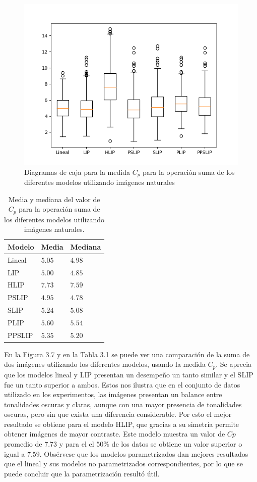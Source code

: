 \begin{figure}[h]
	\begin{center}
		\includegraphics[width=10.0 cm]{images/graphics/sum_all.png}
		\caption{Diagramas de caja para la medida $C_p$ para la operaci\'on suma de los diferentes modelos utilizando im\'agenes naturales}
	\end{center}
\end{figure}

\begin{table}[h]
	\begin{center}
		\begin{tabular}{|l|l|l|}
			\hline 
			Modelo & Media & Mediana\\
			\hline
			Lineal & $5.05$ & $4.98$\\
			\hline
			LIP & $5.00$ & $4.85$\\
			\hline
			HLIP & $7.73$ & $7.59$\\
			\hline
			PSLIP & $4.95$ & $4.78$\\
			\hline
			SLIP & $5.24$ & $5.08$\\
			\hline
			PLIP & $5.60$ & $5.54$\\
			\hline
			PPSLIP & $5.35$ & $5.20$\\
			\hline
		\end{tabular}
		\caption{Media y mediana del valor de $C_p$ para la operaci\'on suma de los diferentes modelos utilizando im\'agenes naturales.}
	\end{center}
\end{table}

En la Figura 3.7 y en la Tabla 3.1 se puede ver una comparaci\'on de la suma de dos im\'agenes utilizando los diferentes modelos, usando la medida $C_p$. Se aprecia que los modelos lineal y LIP presentan un desempe\~no un tanto similar y el SLIP fue un tanto superior a ambos. Estos nos ilustra que en el conjunto de datos utilizado en los experimentos, las im\'agenes presentan un balance entre tonalidades oscuras y claras, aunque con una mayor presencia de tonalidades oscuras, pero sin que exista una diferencia considerable. Por esto el mejor resultado se obtiene para el modelo HLIP, que gracias a su simetr\'ia permite obtener im\'agenes de mayor contraste. Este modelo muestra un valor de $Cp$ promedio de $7.73$ y para el el $50\%$ de los datos se obtiene un valor superior o igual a $7.59$. Obs\'ervese que los modelos parametrizados dan mejores resultados que el lineal y sus modelos no parametrizados correspondientes, por lo que se puede concluir que la parametrizaci\'on result\'o \'util.  

